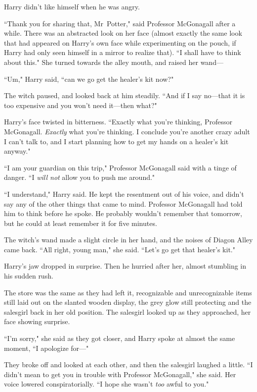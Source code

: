 Harry didn't like himself when he was angry.

``Thank you for sharing that, Mr~Potter," said Professor McGonagall after a while. There was an abstracted look on her face (almost exactly the same look that had appeared on Harry's own face while experimenting on the pouch, if Harry had only seen himself in a mirror to realize that). ``I shall have to think about this." She turned towards the alley mouth, and raised her wand—

``Um," Harry said, ``can we go get the healer's kit now?"

The witch paused, and looked back at him steadily. ``And if I say no—that it is too expensive and you won't need it—then what?"

Harry's face twisted in bitterness. ``Exactly what you're thinking, Professor McGonagall. \emph{Exactly} what you're thinking. I conclude you're another crazy adult I can't talk to, and I start planning how to get my hands on a healer's kit anyway."

``I am your guardian on this trip," Professor McGonagall said with a tinge of danger. ``I \emph{will not} allow you to push me around."

``I understand," Harry said. He kept the resentment out of his voice, and didn't say any of the other things that came to mind. Professor McGonagall had told him to think before he spoke. He probably wouldn't remember that tomorrow, but he could at least remember it for five minutes.

The witch's wand made a slight circle in her hand, and the noises of Diagon Alley came back. ``All right, young man," she said. ``Let's go get that healer's kit."

Harry's jaw dropped in surprise. Then he hurried after her, almost stumbling in his sudden rush.

\later

The store was the same as they had left it, recognizable and unrecognizable items still laid out on the slanted wooden display, the grey glow still protecting and the salesgirl back in her old position. The salesgirl looked up as they approached, her face showing surprise.

``I'm sorry," she said as they got closer, and Harry spoke at almost the same moment, ``I apologize for—"

They broke off and looked at each other, and then the salesgirl laughed a little. ``I didn't mean to get you in trouble with Professor McGonagall," she said. Her voice lowered conspiratorially. ``I hope she wasn't \emph{too} awful to you."

